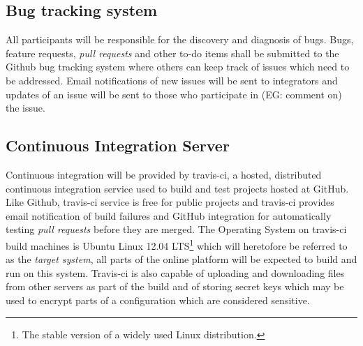 \subsection{Bug tracking system}
\label{sec:bug tracking-system}

All participants will be responsible for the discovery and diagnosis of bugs. Bugs, feature
requests, \emph{pull requests} and other to-do items shall be submitted to the Github bug tracking
system where others can keep track of issues which need to be addressed. Email notifications of new
issues will be sent to integrators and updates of an issue will be sent to those who participate in
(EG: comment on) the issue.

\subsection{Continuous Integration Server}
\label{sec:ci-server}

Continuous integration will be provided by travis-ci, a hosted, distributed continuous integration
service used to build and test projects hosted at GitHub. Like Github, travis-ci service is free
for public projects and travis-ci provides email notification of build failures and GitHub
integration for automatically testing \emph{pull requests} before they are merged.
The Operating System on travis-ci build machines is Ubuntu Linux 12.04 LTS\footnote{The stable
version of a widely used Linux distribution.} which will heretofore be referred to as the
\emph{target system}, all parts of the online platform will be expected to build and run on this
system. Travis-ci is also capable of uploading and downloading files from other servers as part of
the build and of storing secret keys which may be used to encrypt parts of a configuration which
are considered sensitive.
